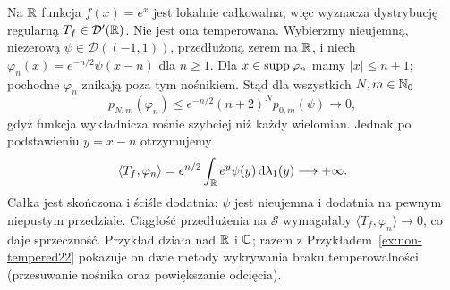 \begin{przyklad}
\label{ex:non-tempered25}
Na $\mathbb R$ funkcja $f(x)=e^x$ jest lokalnie całkowalna,
więc wyznacza dystrybucję regularną $T_f\in\mathcal D'(\mathbb R)$.
Nie jest ona temperowana. Wybierzmy nieujemną, niezerową
$\psi\in\mathcal D((-1,1))$, przedłużoną zerem na $\mathbb R$,
i niech $\varphi_n(x)=e^{-n/2}\psi(x-n)$ dla $n\ge1$.
Dla $x\in\operatorname{supp}\varphi_n$ mamy $|x|\le n+1$; pochodne
$\varphi_n$ znikają poza tym nośnikiem. Stąd dla wszystkich
$N,m\in\mathbb N_0$
\[
 p_{N,m}(\varphi_n)\le e^{-n/2}(n+2)^N p_{0,m}(\psi)
 \longrightarrow0,
\]
gdyż funkcja wykładnicza rośnie szybciej niż każdy
wielomian. Jednak po podstawieniu $y=x-n$ otrzymujemy
\[
 \langle T_f,\varphi_n\rangle=
 e^{n/2}\int_\mathbb R e^y\psi(y)\,\mathrm d\lambda_1(y)
 \longrightarrow+\infty.
\]
Całka jest skończona i ściśle dodatnia: $\psi$ jest
nieujemna i dodatnia na pewnym niepustym przedziale.
Ciągłość przedłużenia na $\mathcal S$ wymagałaby
$\langle T_f,\varphi_n\rangle\to0$, co daje sprzeczność.
Przykład działa nad $\mathbb R$ i $\mathbb C$; razem z
Przykładem~\ref{ex:non-tempered22} pokazuje on dwie
metody wykrywania braku temperowalności (przesuwanie
nośnika oraz powiększanie odcięcia).
\end{przyklad}
